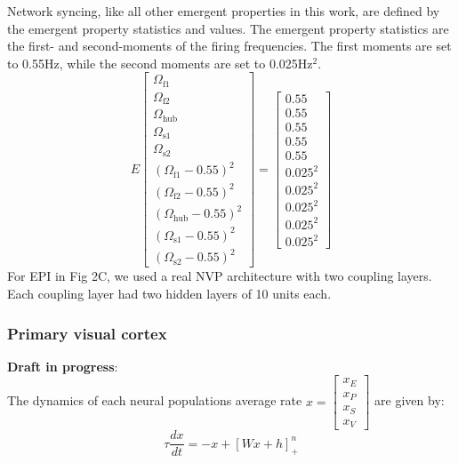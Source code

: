 \documentclass[11pt]{article}
\begin{document}
Network syncing, like all other emergent properties in this work, are defined by the emergent property statistics and values.  The emergent property statistics are the first- and second-moments of the firing frequencies. The first moments are set to 0.55Hz, while the second moments are set to 0.025Hz$^2$.
\begin{equation}
E \begin{bmatrix} \Omega_{\text{f1}} \\ \Omega_{\text{f2}} \\ \Omega_{\text{hub}} \\ \Omega_{\text{s1}} \\ \Omega_{\text{s2}} \\ (\Omega_{\text{f1}} - 0.55)^2 \\ (\Omega_{\text{f2}} - 0.55)^2 \\ (\Omega_{\text{hub}} - 0.55)^2 \\ (\Omega_{\text{s1}} - 0.55)^2 \\ (\Omega_{\text{s2}} - 0.55)^2  \end{bmatrix} = \begin{bmatrix} 0.55 \\ 0.55 \\ 0.55 \\ 0.55 \\ 0.55 \\ 0.025^2 \\ 0.025^2 \\ 0.025^2 \\ 0.025^2 \\ 0.025^2 \end{bmatrix}
\end{equation}
For EPI in Fig 2C, we used a real NVP architecture with two coupling layers.  Each coupling layer had two hidden layers of 10 units each.

\subsubsection{Primary visual cortex}\label{methods_V1}
\textbf{Draft in progress}: \\
The dynamics of each neural populations average rate
$x = \begin{bmatrix} x_E \\ x_P \\ x_S \\ x_V \end{bmatrix}$
are given by:
\begin{equation}
\tau \frac{dx}{dt} = -x + [W x+ h]_+^n
\end{equation}
\end{document}
